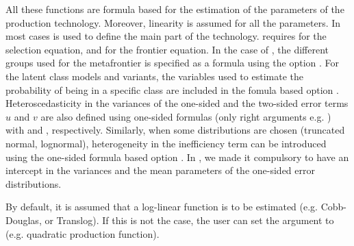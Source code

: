 \documentclass[nojss]{jss}
\begin{document}
All these functions are formula based for the estimation of the parameters of the 
production technology. Moreover, linearity is assumed for all the parameters.
In most cases  is used to define the main part of the technology. 
 requires  for the selection
equation, and  for the frontier equation. In the case of 
, the different groups used for the metafrontier is 
specified as a formula using the option . For the latent class models
and variants, the variables used to estimate the probability of being in a 
specific class are included in the fomula based option . Heteroscedasticity in 
the variances of the one-sided and the two-sided error terms $u$ and $v$ are 
also defined using one-sided formulas (only right arguments e.g. ) 
with  and , respectively. Similarly, when some 
distributions are chosen (truncated normal, lognormal), heterogeneity in the 
inefficiency term can be introduced using the one-sided formula based option 
. In , we made it compulsory to have an intercept in the 
variances and the mean parameters of the one-sided error distributions.

By default, it is assumed that a log-linear function is to be estimated 
(e.g. Cobb-Douglas, or Translog). If this is not the case, the user can set the 
argument  to  (e.g. quadratic production function).
\end{document}
